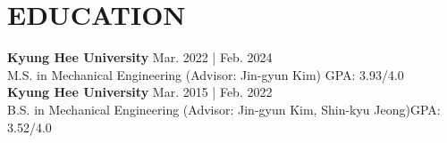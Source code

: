 \documentclass[a4paper,10pt]{extarticle}
\begin{document}
\section*{EDUCATION}
\noindent
\textbf{Kyung Hee University} \hfill Mar. 2022 | Feb. 2024\\ %
M.S. in Mechanical Engineering (Advisor: Jin-gyun Kim) \hfill GPA: 3.93/4.0\\ %
\textbf{Kyung Hee University} \hfill Mar. 2015 | Feb. 2022\\ %
B.S. in Mechanical Engineering (Advisor: Jin-gyun Kim, Shin-kyu Jeong)\hfill GPA: 3.52/4.0 %

\end{document}
